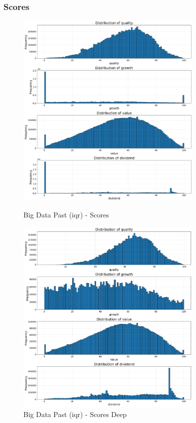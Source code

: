 \documentclass[11pt,english,a4paper,hidelinks]{book}
\begin{document}
\subsubsection{Scores}
\begin{figure}[H]
    \centering
    \begin{minipage}{0.48\textwidth}
        \centering
        \includegraphics[width=0.8\textwidth]{images/code/descriptive analysis/distributions/Big Data past IQR - Scores.png}
    \caption{Big Data Past (\acrshort{iqr}) - Scores}
    \label{fig:past_scores}
    \end{minipage}\hfill
    \begin{minipage}{0.48\textwidth}
        \centering
        \includegraphics[width=0.8\textwidth]{images/code/descriptive analysis/distributions/Big Data past IQR - Scores Deep.png}
        \caption{Big Data Past (\acrshort{iqr}) - Scores Deep}
        \label{fig:past_scores_deep}
    \end{minipage}
\end{figure}
\end{document}
